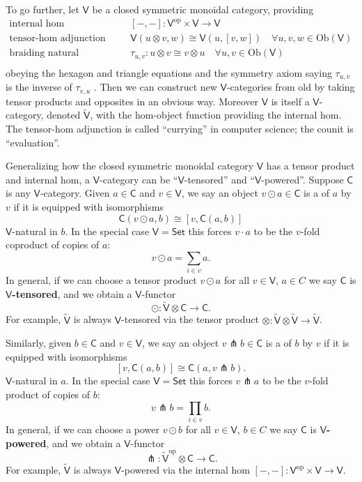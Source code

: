 \documentclass{amsart}
\newcommand{\define}[1]{{\bf \boldmath{#1}}}
\theoremstyle{definition}
\newcommand{\Set}{\mathsf{Set}}
\newcommand{\V}{\mathsf{V}}
\newcommand{\C}{\mathsf{C}}
\newcommand{\op}{\mathrm{op}}
\newcommand{\Obj}{\mathrm{Ob}}
\newcommand{\pfk}{\pitchfork}
\newcommand{\maps}{\colon}
\begin{document}
To go further, let $\V$ be a closed symmetric monoidal category, providing
\[\begin{array}{rl}
\text{internal hom} & [-,-]\maps\V^\op \times \V \to \V\\
\text{tensor-hom adjunction} & \V(u\otimes v,w) \cong \V(u,[v,w]) \quad \forall u,v,w \in \Obj(\V)\\
\text{braiding natural isomorphism} & \tau_{u,v}\maps u \otimes v \cong v \otimes u \quad \forall u,v \in \Obj(\V)\\
\end{array}\]
obeying the hexagon and triangle equations and the symmetry axiom saying $\tau_{u,v}$ is the inverse of $\tau_{v,u}$ \cite{maclane}.   Then we can construct new $\V$-categories from old by taking tensor products and opposites in an obvious way.   Moreover $\V$ is itself a $\V$-category, denoted $\tilde{\V}$, with the hom-object function providing the internal hom.  The tensor-hom adjunction is called ``currying'' in computer science; the counit is ``evaluation''.  

Generalizing how the closed symmetric monoidal category $\V$ has a tensor product and internal hom, a $\V$-category can be ``$\V$-tensored'' and ``$\V$-powered''.   
Suppose $\C$ is any $\V$-category.  Given $a \in \C$ and $v \in \V$, we say an object 
$v \odot a \in \C$ is a \define{tensor product} of $a$ by $v$ if it is equipped with isomorphisms
\begin{equation}\label{eq:tensor}
	\C(v\odot a,b) \cong \left[v, \C(a,b)\right]
\end{equation}
$\V$-natural in $b$.
In the special case $\V = \Set$ this forces $v \cdot a$ to be the $v$-fold coproduct 
of copies of $a$:
\[       v \odot a = \sum_{i \in v} a . \]
In general, if we can choose a tensor product $v \odot a$ for all $v \in \V$, $a \in C$
we say $\C$ is \textbf{$\V$-tensored}, and we obtain a $\V$-functor
\[
	\odot \maps \tilde{\V} \otimes \C \to \C.
\]
For example, $\tilde{\V}$ is always $\V$-tensored via the tensor product
$ \otimes \maps \tilde{\V} \otimes \tilde{\V} \to \tilde{\V} $.

Similarly, given $b \in \C$ and $v \in \V$, we say an object $v \pfk b \in \C$ is a \define{power} of $b$ by $v$ if it is equipped with isomorphisms
\begin{equation}\label{eq:power}
		 \left[v, \C(a,b)\right] \cong \C(a,v\pfk b) .
\end{equation}
$\V$-natural in $a$.  In the special case $\V = \Set$  this forces $v \pfk a$ to be the $v$-fold product of copies of $b$:
\[          v \pfk b = \prod_{i \in v} b . \]
In general, if we can choose a power $v \odot b$ for all $v \in \V$, $b \in C$
we say $\C$ is \textbf{$\V$-powered}, and we obtain a $\V$-functor
\[
\pfk \maps \tilde{\V}^\op \otimes \C \to \C .
\]
For example, $\tilde{\V}$ is always $\V$-powered via the internal hom
$[-,-] \maps \V^\op \times \V \to \V $.
\end{document}
